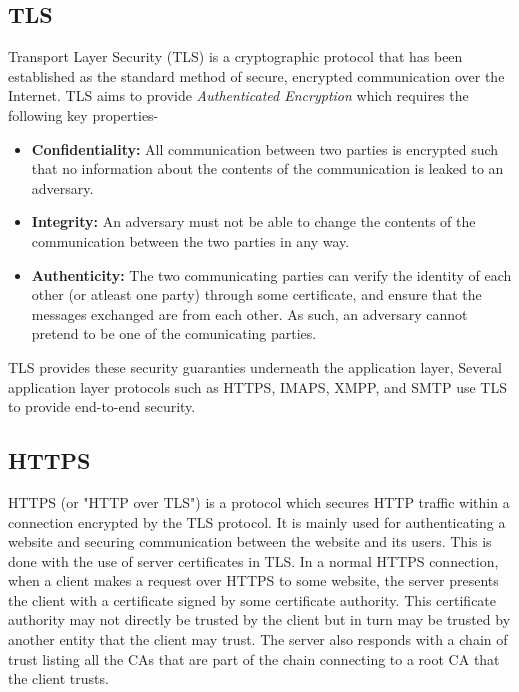 \subsection{TLS}
Transport Layer Security (TLS) is a cryptographic protocol that has been
established as the standard method of secure, encrypted communication over the
Internet\cite{RFC5246}. TLS aims to provide \emph{Authenticated Encryption} which requires the
following key properties-
\begin{itemize}
  \item \textbf{Confidentiality:} All communication between two parties is
  encrypted such that no information about the contents of the communication is
  leaked to an adversary.

  \item \textbf{Integrity:} An adversary must not be able to change the
  contents of the communication between the two parties in any way.

  \item \textbf{Authenticity:} The two communicating parties can verify the
  identity of each other (or atleast one party) through some certificate, and
  ensure that the messages exchanged are from each other. As such, an adversary
  cannot pretend to be one of the comunicating parties.
\end{itemize}

TLS provides these security guaranties underneath the application layer,
Several application layer protocols such as HTTPS, IMAPS, XMPP, and SMTP use TLS
to provide end-to-end security.

\subsection{HTTPS}
HTTPS (or "HTTP over TLS") is a protocol which secures HTTP traffic within a
connection encrypted by the TLS protocol\cite{RFC2818}. It is mainly used for
authenticating a website and securing communication between the website and its
users. This is done with the use of server certificates in TLS\cite{RFC5280}.
In a normal HTTPS connection, when a client makes a request over HTTPS to some
website, the server presents the client with a certificate signed by some
certificate authority. This certificate authority may not directly be trusted
by the client but in turn may be trusted by another entity that the client may
trust. The server also responds with a chain of trust listing all the CAs that
are part of the chain connecting to a root CA that the client trusts.


